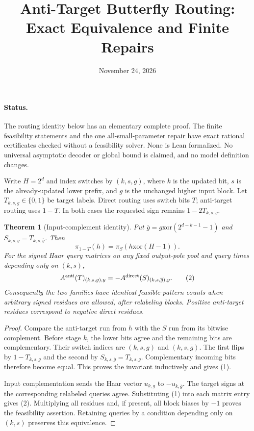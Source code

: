 \documentclass[11pt]{article}
\title{Anti-Target Butterfly Routing: Exact Equivalence and Finite Repairs}
\author{}
\date{November 24, 2026}
\newtheorem{theorem}{Theorem}
\begin{document}
\maketitle

\paragraph{Status.}
The routing identity below has an elementary complete proof. The finite
feasibility statements and the one all-small-parameter repair have exact
rational certificates checked without a feasibility solver. None is
Lean formalized. No universal asymptotic decoder or global bound is
claimed, and no model definition changes.

Write $H=2^d$ and index switches by $(k,s,g)$, where $k$ is the updated
bit, $s$ is the already-updated lower prefix, and $g$ is the unchanged
higher input block. Let $T_{k,s,g}\in\{0,1\}$ be target labels.
Direct routing uses switch bits $T$; anti-target routing uses $1-T$.
In both cases the requested sign remains $1-2T_{k,s,g}$.

\begin{theorem}[Input-complement identity]
Put $\overline g=g\mathbin{\mathrm{xor}}(2^{d-k-1}-1)$ and
$S_{k,s,g}=T_{k,s,\overline g}$. Then
\[
 \pi_{1-T}(h)=\pi_S(h\mathbin{\mathrm{xor}}(H-1)).
 \tag{1}
\]
For the signed Haar query matrices on any fixed output-pole pool and
query times depending only on $(k,s)$,
\[
 A^{\rm anti}(T)_{(k,s,g),y}
 =-A^{\rm direct}(S)_{(k,s,\overline g),y}.
 \tag{2}
\]
Consequently the two families have identical feasible-pattern counts
when arbitrary signed residues are allowed, after relabeling blocks.
Positive anti-target residues correspond to negative direct residues.
\end{theorem}
\begin{proof}
Compare the anti-target run from $h$ with the $S$ run from its bitwise
complement. Before stage $k$, the lower bits agree and the remaining
bits are complementary. Their switch indices are $(k,s,g)$ and
$(k,s,\overline g)$. The first flips by $1-T_{k,s,g}$ and the second
by $S_{k,s,\overline g}=T_{k,s,g}$. Complementary incoming bits
therefore become equal. This proves the invariant inductively and
gives (1).

Input complementation sends the Haar vector $u_{k,g}$ to
$-u_{k,\overline g}$. The target signs at the corresponding relabeled
queries agree. Substituting (1) into each matrix entry gives (2).
Multiplying all residues and, if present, all block biases by $-1$
proves the feasibility assertion. Retaining queries by a condition
depending only on $(k,s)$ preserves this equivalence.
\end{proof}
\end{document}

